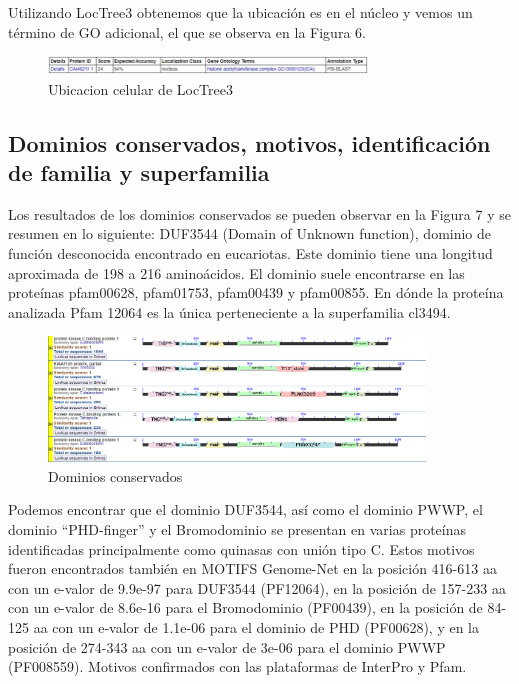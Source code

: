 \documentclass[journal,transmag]{IEEEtran}
\begin{document}
Utilizando LocTree3 obtenemos que la ubicación es en el núcleo y vemos un término de GO adicional, el que se observa en la Figura 6. 
\begin{figure}[!h]
	\center
	\includegraphics[width=8.5cm]{imagenes/loca2.png}
	\caption{Ubicacion celular de LocTree3}
	\label{6}
\end{figure}

\subsection{\textbf{ Dominios conservados, motivos, identificación de familia y superfamilia}}


Los resultados de los dominios conservados se pueden observar en la Figura 7 y se resumen en lo siguiente: DUF3544 (Domain of Unknown function), dominio de función desconocida encontrado en eucariotas. Este dominio tiene una longitud aproximada de 198 a 216 aminoácidos. El dominio suele encontrarse en las proteínas pfam00628, pfam01753, pfam00439 y pfam00855. En dónde la proteína analizada Pfam 12064 es la única perteneciente a la superfamilia cl3494.

\begin{figure}[!h]
	\center
	\includegraphics[width=10cm]{imagenes/dominios.png}
	\caption{Dominios conservados}
	\label{8}
\end{figure}

Podemos encontrar que el dominio DUF3544, así como el dominio PWWP, el dominio “PHD-finger” y el Bromodominio se presentan en varias proteínas identificadas principalmente como quinasas con unión tipo C. Estos motivos fueron encontrados también en MOTIFS Genome-Net en la posición 416-613 aa con un e-valor de 9.9e-97 para DUF3544 (PF12064), en la posición de 157-233 aa  con un e-valor de 8.6e-16 para el Bromodominio (PF00439), en la posición de 84-125 aa con un e-valor de 1.1e-06 para el dominio de PHD (PF00628), y en la posición de 274-343 aa con un e-valor de 3e-06 para el dominio PWWP (PF008559).  Motivos confirmados con las plataformas de InterPro y Pfam. 
\end{document}
